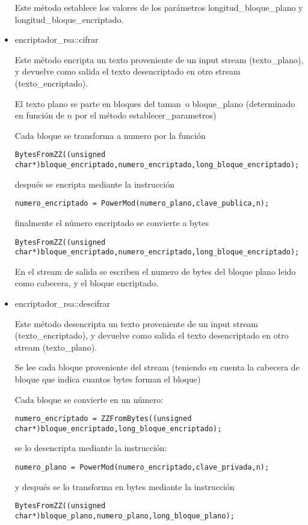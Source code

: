 \documentclass[spanish]{article}
\begin{document}
\begin{itemize}
Este método establece los valores de los parámetros longitud\_bloque\_plano 
y longitud\_bloque\_encriptado. 

\item encriptador\_rsa::cifrar

Este método encripta un texto proveniente de un input stream 
(texto\_plano), y devuelve como salida el texto desencriptado
en otro stream (texto\_encriptado).

El texto plano se parte en bloques del taman~o bloque\_plano (determinado 
en función de $n$ por el método establecer\_parametros)

Cada bloque se transforma a numero por la función

\begin{verbatim}
BytesFromZZ((unsigned char*)bloque_encriptado,numero_encriptado,long_bloque_encriptado);
\end{verbatim}

después se encripta mediante la instrucción 

\begin{verbatim}
numero_encriptado = PowerMod(numero_plano,clave_publica,n);
\end{verbatim}

finalmente el número encriptado se convierte a bytes

\begin{verbatim}
BytesFromZZ((unsigned char*)bloque_encriptado,numero_encriptado,long_bloque_encriptado);
\end{verbatim}

En el stream de salida se escriben el numero de bytes del bloque plano leido 
como cabecera, y el bloque encriptado.

\item encriptador\_rsa::descifrar

Este método desencripta un texto proveniente de un input stream 
(texto\_encriptado), y devuelve como salida el texto desencriptado
en otro stream (texto\_plano).

Se lee cada bloque proveniente del stream (teniendo en cuenta la cabecera
de bloque que indica cuantos bytes forman el bloque)

Cada bloque se convierte en un número:

\begin{verbatim}
numero_encriptado = ZZFromBytes((unsigned char*)bloque_encriptado,long_bloque_encriptado);
\end{verbatim}

se lo desencripta mediante la instrucción:

\begin{verbatim}
numero_plano = PowerMod(numero_encriptado,clave_privada,n);
\end{verbatim}

y después se lo transforma en bytes mediante la instrucción

\begin{verbatim}
BytesFromZZ((unsigned char*)bloque_plano,numero_plano,long_bloque_plano);
\end{verbatim}

\end{itemize}
\end{document}
